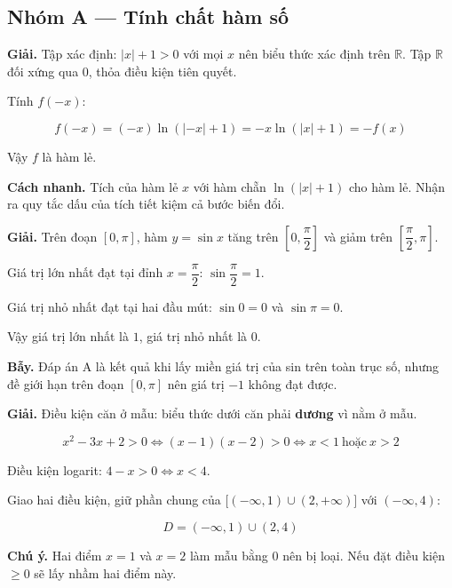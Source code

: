 \documentclass[11pt, a4paper]{article}
\begin{document}

\subsection*{Nhóm A — Tính chất hàm số}

\begin{dapan}[1 — Đáp án A]
\textbf{Giải.} Tập xác định: $|x| + 1 > 0$ với mọi $x$ nên biểu thức xác định trên $\mathbb{R}$. Tập $\mathbb{R}$ đối xứng qua $0$, thỏa điều kiện tiên quyết.

Tính $f(-x)$:

$$f(-x) = (-x)\ln(|-x| + 1) = -x\ln(|x| + 1) = -f(x)$$

Vậy $f$ là hàm lẻ.

\textbf{Cách nhanh.} Tích của hàm lẻ $x$ với hàm chẵn $\ln(|x|+1)$ cho hàm lẻ. Nhận ra quy tắc dấu của tích tiết kiệm cả bước biến đổi.
\end{dapan}

\begin{dapan}[2 — Đáp án C]
\textbf{Giải.} Trên đoạn $[0, \pi]$, hàm $y = \sin x$ tăng trên $\left[0, \dfrac{\pi}{2}\right]$ và giảm trên $\left[\dfrac{\pi}{2}, \pi\right]$.

Giá trị lớn nhất đạt tại đỉnh $x = \dfrac{\pi}{2}$: $\sin\dfrac{\pi}{2} = 1$.

Giá trị nhỏ nhất đạt tại hai đầu mút: $\sin 0 = 0$ và $\sin\pi = 0$.

Vậy giá trị lớn nhất là $1$, giá trị nhỏ nhất là $0$.

\textbf{Bẫy.} Đáp án A là kết quả khi lấy miền giá trị của sin trên toàn trục số, nhưng đề giới hạn trên đoạn $[0,\pi]$ nên giá trị $-1$ không đạt được.
\end{dapan}

\begin{dapan}[3 — Đáp án A]
\textbf{Giải.} Điều kiện căn ở mẫu: biểu thức dưới căn phải \textbf{dương} vì nằm ở mẫu.

$$x^2 - 3x + 2 > 0 \iff (x-1)(x-2) > 0 \iff x < 1 \ \text{hoặc} \ x > 2$$

Điều kiện logarit: $4 - x > 0 \iff x < 4$.

Giao hai điều kiện, giữ phần chung của $\big[(-\infty,1)\cup(2,+\infty)\big]$ với $(-\infty,4)$:

$$D = (-\infty, 1) \cup (2, 4)$$

\textbf{Chú ý.} Hai điểm $x = 1$ và $x = 2$ làm mẫu bằng $0$ nên bị loại. Nếu đặt điều kiện $\ge 0$ sẽ lấy nhầm hai điểm này.
\end{dapan}
\end{document}
